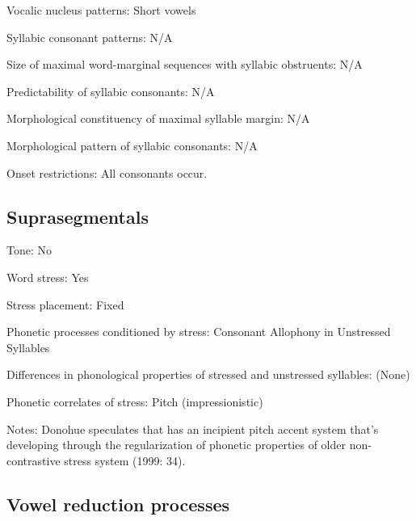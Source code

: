 {\begin{appendixdesc}
\item[Vocalic nucleus patterns:] Short vowels

\item[Syllabic consonant patterns:] N/A

\item[Size of maximal word-marginal sequences with syllabic obstruents:] N/A

\item[Predictability of syllabic consonants:] N/A

\item[Morphological constituency of maximal syllable margin:] N/A

\item[Morphological pattern of syllabic consonants:] N/A

\item[Onset restrictions:] All consonants occur.
\end{appendixdesc}
\subsection*{Suprasegmentals}
\begin{appendixdesc}
\item[Tone:] No

\item[Word stress:] Yes

\item[Stress placement:] Fixed

\item[Phonetic processes conditioned by stress:] Consonant Allophony in Unstressed Syllables

\item[Differences in phonological properties of stressed and unstressed syllables:] (None)

\item[Phonetic correlates of stress:] Pitch (impressionistic)

\item[Notes:] Donohue speculates that  has an incipient pitch accent system that’s developing through the regularization of phonetic properties of older non-contrastive stress system (1999: 34).
\end{appendixdesc}
\subsection*{Vowel reduction processes}
\begin{appendixdesc}


\end{appendixdesc}}
